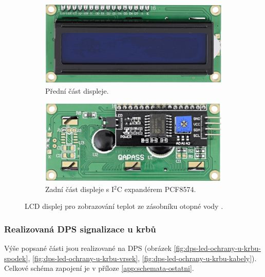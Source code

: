 \begin{figure}[H]
\centering
\begin{subfigure}{.5\textwidth}
  \centering
  \includegraphics[width=0.91\linewidth]{images/krb/predni-cast-lcd-displeje.png}
  \caption{Přední část displeje.}
  \label{fig:predni-cast-lcd-displeje}
\end{subfigure}%
\begin{subfigure}{.5\textwidth}
  \centering
  \includegraphics[width=0.9\linewidth]{images/krb/zadni-cast-lcd-displeje-s-expanderem-pcf8574.png}
  \caption{Zadní část displeje s I$^2$C expandérem PCF8574.}
  \label{fig:zadni-cast-lcd-displeje-s-expanderem-pcf857}
\end{subfigure}
\caption[LCD displej pro zobrazování teplot ze zásobníku otopné vody.]{LCD displej pro zobrazování teplot ze zásobníku otopné vody \cite{lcd-displej}.}
\label{fig:lcd-displej}
\end{figure}

\subsubsection{Realizovaná DPS signalizace u krbů}
Výše popsané části jsou realizované na DPS (obrázek \ref{fig:dps-led-ochrany-u-krbu-spodek}, \ref{fig:dps-led-ochrany-u-krbu-vrsek}, \ref{fig:dps-led-ochrany-u-krbu-kabely}). Celkové schéma zapojení je v příloze \ref{app:schemata-ostatni}.

